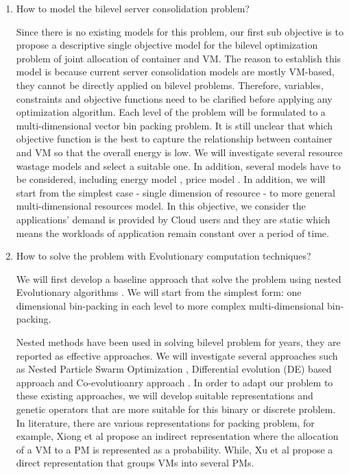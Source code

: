 \begin{enumerate}
	\item How to model the bilevel server consolidation problem?

	Since there is no existing models for this problem, our first sub objective is to propose a descriptive single objective model for the bilevel optimization problem of joint allocation of container and VM. The reason to establish this model is because current server consolidation models are mostly VM-based, they cannot be directly applied on bilevel problems. Therefore, variables, constraints and objective functions need to be clarified before applying any optimization algorithm. Each level of the problem will be formulated to a multi-dimensional vector bin packing problem. It is still unclear that which objective function is the best to capture the relationship between container and VM so that the overall energy is low. We will investigate several resource wastage models \cite{Ferdaus:2014ep, Xu:2010vh, Gao:2013gg} and select a suitable one. In addition, several models have to be considered, including energy model \cite{Dayarathna:2016ua}, price model \cite{AlRoomi:2013te}. In addition, we will start from the simplest case - single dimension of resource - to more general multi-dimensional resources model. In this objective, we consider the applications' demand is provided by Cloud users and they are static which means the workloads of application remain constant over a period of time.

	\item How to solve the problem with Evolutionary computation techniques?

	We will first develop a baseline approach that solve the problem using nested Evolutionary algorithms \cite{Sinha:2017et}. We will start from the simplest form: one dimensional bin-packing in each level to more complex multi-dimensional bin-packing.

	Nested methods have been used in solving bilevel problem for years, they are reported as effective approaches. We will investigate several approaches such as Nested Particle Swarm Optimization \cite{Li:2006br}, Differential evolution (DE) based approach \cite{Angelo:2013ee, Zhu:2006in} and Co-evolutioanry approach \cite{Legillon:2012dd}. In order to adapt our problem to these existing approaches, we will develop suitable representations and genetic operators that are more suitable for this binary or discrete problem. In literature, there are various representations for packing problem, for example, Xiong et al \cite{Xiong:2014jq} propose an indirect representation where the allocation of a VM to a PM is represented as a probability. While, Xu et al \cite{Xu:2010vh} propose a direct representation that groups VMs into several PMs.


\end{enumerate}
